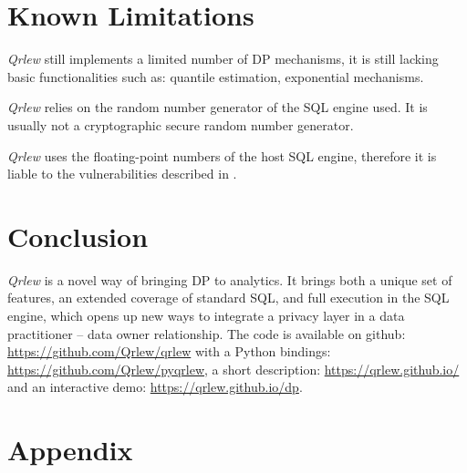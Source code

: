 \documentclass[letterpaper]{article} %
\newcommand{\qrlew}{\emph{Qrlew}}
\begin{document}
\section{Known Limitations}
\label{sec:limitations}

\qrlew{} still implements a limited number of DP mechanisms, it is still lacking basic functionalities such as: quantile estimation, exponential mechanisms.

\qrlew{} relies on the random number generator of the SQL engine used. It is usually not a cryptographic secure random number generator.

\qrlew{} uses the floating-point numbers of the host SQL engine, therefore it is liable to the vulnerabilities described in \cite{casacuberta2022widespread}.

\section{Conclusion}

\qrlew{} is a novel way of bringing DP to analytics. It brings both a unique set of features, an extended coverage of standard SQL, and full execution in the SQL engine, which opens up new ways to integrate a privacy layer in a data practitioner -- data owner relationship.
The code is available on github: \url{https://github.com/Qrlew/qrlew} with a Python bindings: \url{https://github.com/Qrlew/pyqrlew}, a short description: \url{https://qrlew.github.io/}\\
and an interactive demo: \url{https://qrlew.github.io/dp}.


\appendix

\section*{Appendix}
\end{document}
